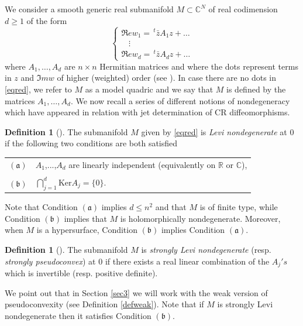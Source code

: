 \documentclass[12pt]{amsart}
\newcommand{\C}{\mathbb C}
\newcommand{\R}{\mathbb R}
\newcommand{\transp}{\,^t}
\newcommand{\aaa}{\mathfrak{(a)}}
\newcommand{\bbb}{\mathfrak{(b)}}
\theoremstyle{remark}
\theoremstyle{example}
\theoremstyle{definition}
\newtheorem{defi}[theo]{Definition}
\numberwithin{equation}{section}
\begin{document}
We consider  a smooth generic  real submanifold  $M \subset \C^{N}$ of real codimension $d\ge 1$ of the form 
\begin{equation}\label{eqred}
\begin{cases}
\Re e  w_1= \transp\bar z A_1 z+ \ldots\\
\ \ \ \ \vdots \\
\Re e  w_d = \transp\bar z A_d z+ \ldots
\end{cases}
\end{equation}
where $A_1,\hdots,A_d$ are $n\times n$ Hermitian matrices and where the dots represent terms in $z$ and $\Im m w$ of higher (weighted) order (see \cite{bo,bl-me}). In case there are no dots in \eqref{eqred}, we refer to $M$ as a model quadric and we say that $M$ is defined by the matrices $A_1,\ldots,A_d$.  We now recall a series of different notions of nondegeneracy which have appeared in relation with jet determination of CR diffeomorphisms. 





\begin{defi} [\cite{be1}]\label{defnondegbe}
The submanifold $M$ given by \eqref{eqred} is  {\it Levi nondegenerate} at 0 if the following two conditions are both satisfied
\begin{center}
\begin{tabular}{cl}
$\aaa$ & $A_1$,...,$A_d$ are linearly independent (equivalently on $\R$ or $\C$),\\
\\
$\bbb$ & $\bigcap_{j=1}^d\mathrm{Ker}A_j=\{0\}$.
\end{tabular}
\end{center}
\end{defi}

Note that Condition $\aaa$ implies  $d \le n^2$  and  that $M$ is  of finite type, while Condition $\bbb$ implies that $M$ is holomorphically nondegenerate. Moreover,  when $M$ is a hypersurface, Condition $\bbb$ implies Condition  $\aaa$. 

\begin{defi} [\cite{tu}] \label{defnondegtu}
The submanifold $M$ is  {\it strongly Levi nondegenerate} (resp. {\it strongly pseudoconvex}) at 0 if there exists a real linear combination of the $A_j's$ which is invertible (resp. positive definite).
\end{defi}

We point out that in Section \ref{sec3} we will work with the weak version of pseudoconvexity (see Definition  \ref{defweak}).
Note that  if $M$ is  strongly Levi nondegenerate then it satisfies Condition   $\bbb.$ 
\end{document}
